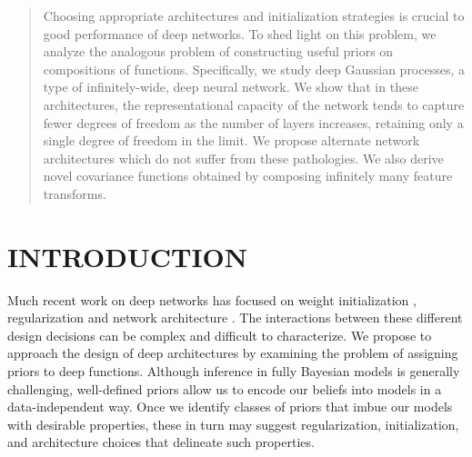 \documentclass[twoside]{article}
\newcommand{\sectiondist}{}
\begin{document}




\begin{abstract}
Choosing appropriate architectures and initialization strategies is crucial to good performance of deep networks.  To shed light on this problem, we analyze the analogous problem of constructing useful priors on compositions of functions.  Specifically, we study deep Gaussian processes, a type of infinitely-wide, deep neural network.  We show that in these architectures, the representational capacity of the network tends to capture fewer degrees of freedom as the number of layers increases, retaining only a single degree of freedom in the limit.  We propose alternate network architectures which do not suffer from these pathologies.  We also derive novel covariance functions obtained by composing infinitely many feature transforms.
\end{abstract}

\section{INTRODUCTION}
\sectiondist

Much recent work on deep networks has focused on weight initialization \citep{martens2010deep}, regularization \citep{lee2007sparse} and network architecture \citep{gens2013learning}.  The interactions between these different design decisions can be complex and difficult to characterize. We propose to approach the design of deep architectures by examining the problem of assigning priors to deep functions. Although inference in fully Bayesian models is generally challenging, well-defined priors allow us to encode our beliefs into models in a data-independent way. Once we identify classes of priors that imbue our models with desirable properties, these in turn may suggest regularization, initialization, and architecture choices that delineate such properties.
\end{document}
